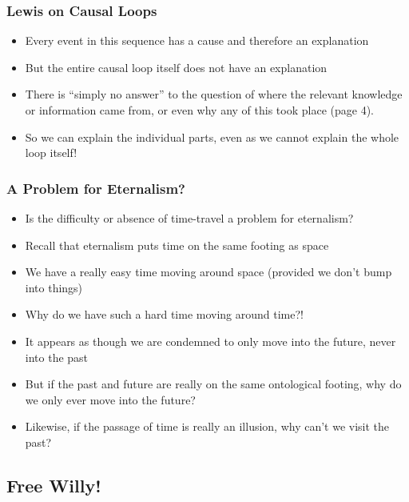\begin{frame}
\frametitle{Lewis on Causal Loops}

\begin{itemize}[<+->]

\item Every event in this sequence has a cause and therefore an explanation
\item But the entire causal loop itself does not have an explanation
\item There is ``simply no answer'' to the question of where the relevant knowledge or information came from, or even why any of this took place (page 4).
\item So we can explain the individual parts, even as we cannot explain the whole loop itself!


\end{itemize}
\end{frame}



\begin{frame}
\frametitle{A Problem for Eternalism?}

\begin{itemize}%

\item Is the difficulty or absence of time-travel a problem for eternalism?
\item Recall that eternalism puts time on the same footing as space
\item We have a really easy time moving around space (provided we don’t bump into things)
\item Why do we have such a hard time moving around time?! %
\item It appears as though we are condemned to only move into the future, never into the past
\item But if the past and future are really on the same ontological footing, why do we only ever move into the future?
\item Likewise, if the passage of time is really an illusion, why can’t we visit the past?

\end{itemize}
\end{frame}


\iffalse 


\subsection{Free Willy!}

